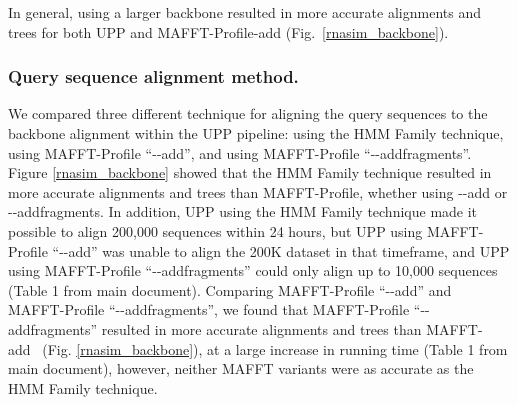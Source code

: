In general, using a larger backbone resulted in more accurate alignments and trees for both UPP and MAFFT-Profile-add (Fig.~\ref{rnasim_backbone}).  
\clearpage
\subsubsection{Query sequence alignment method.}  

We compared three different technique for aligning 
the query sequences to the backbone alignment within the UPP pipeline: using the HMM Family
technique, using 
MAFFT-Profile ``-{}-add'', and using MAFFT-Profile ``-{}-addfragments''. 
Figure \ref{rnasim_backbone} showed that the HMM Family technique  
resulted in more accurate alignments and trees than MAFFT-Profile,
whether using -{}-add or -{}-addfragments.   
In addition, UPP using the HMM Family technique made it possible to align 
200,000 sequences within 24 hours, but UPP using   MAFFT-Profile ``-{}-add'' 
was  unable to align the 200K dataset in that timeframe, and UPP using
 MAFFT-Profile ``-{}-addfragments'' could only align up to 10,000 sequences (Table 1 from main document).  Comparing MAFFT-Profile ``-{}-add'' and MAFFT-Profile ``-{}-addfragments'', we found that MAFFT-Profile ``-{}-addfragments'' resulted in more accurate alignments and trees than MAFFT-add~ (Fig. \ref{rnasim_backbone}), at a large increase in running time (Table 1 from main document), however, neither MAFFT variants were as accurate as the HMM Family technique.



